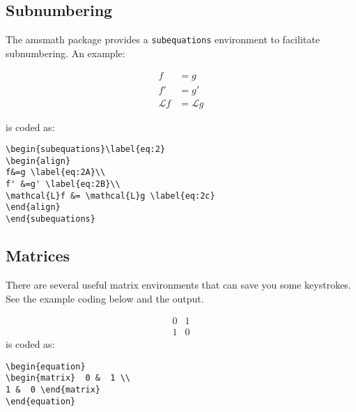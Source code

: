 \documentclass[lettersize,journal]{IEEEtran}
\begin{document}
    \subsection{Subnumbering}
    The amsmath package provides a {\tt{subequations}} environment to facilitate subnumbering. An example:

    \begin{subequations}\label{eq:2}
    \begin{align}
        f&=g \label{eq:2A}\\
        f' &=g' \label{eq:2B}\\
        \mathcal{L}f &= \mathcal{L}g \label{eq:2c}
    \end{align}
    \end{subequations}

    \noindent is coded as:
    \begin{verbatim}
\begin{subequations}\label{eq:2}
\begin{align}
f&=g \label{eq:2A}\\
f' &=g' \label{eq:2B}\\
\mathcal{L}f &= \mathcal{L}g \label{eq:2c}
\end{align}
\end{subequations}

    \end{verbatim}

    \subsection{Matrices}
    There are several useful matrix environments that can save you some keystrokes. See the example coding below and the output.

    \begin{equation}
        \begin{matrix}  0 &  1 \\
        1 &  0 \end{matrix}
    \end{equation}
    is coded as:
    \begin{verbatim}
\begin{equation}
\begin{matrix}  0 &  1 \\
1 &  0 \end{matrix}
\end{equation}
    \end{verbatim}
\end{document}
